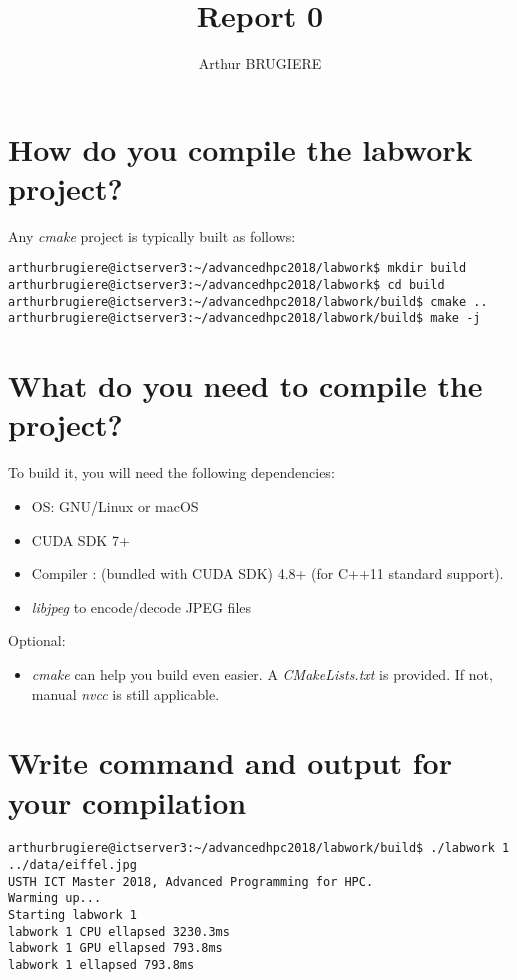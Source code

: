 \documentclass[11pt]{article} %
\title{Report 0}
\author{Arthur BRUGIERE}
\begin{document}
\maketitle

\section{How do you compile the labwork project?}

Any {\it cmake} project is typically built as follows:

\begin{lstlisting}[style=DOS]
arthurbrugiere@ictserver3:~/advancedhpc2018/labwork$ mkdir build
arthurbrugiere@ictserver3:~/advancedhpc2018/labwork$ cd build
arthurbrugiere@ictserver3:~/advancedhpc2018/labwork/build$ cmake ..
arthurbrugiere@ictserver3:~/advancedhpc2018/labwork/build$ make -j
\end{lstlisting}

\section{What do you need to compile the project?}

To build it, you will need the following dependencies:

\begin{itemize}
	\item OS: GNU/Linux or macOS
	\item CUDA SDK 7+ 
	\item Compiler : 
			 (bundled with CUDA SDK)
			 4.8+ (for C++11 standard support).
	\item {\it libjpeg} to encode/decode JPEG files
\end{itemize}

Optional:

\begin{itemize}
\item  {\it cmake} can help you build even easier. A {\it CMakeLists.txt} is provided. If not, manual {\it nvcc} is still applicable.
\end{itemize}

\section{Write command and output for your compilation}

\begin{lstlisting}[style=DOS]
arthurbrugiere@ictserver3:~/advancedhpc2018/labwork/build$ ./labwork 1 ../data/eiffel.jpg
USTH ICT Master 2018, Advanced Programming for HPC.
Warming up...
Starting labwork 1
labwork 1 CPU ellapsed 3230.3ms
labwork 1 GPU ellapsed 793.8ms
labwork 1 ellapsed 793.8ms
\end{lstlisting}
\end{document}
